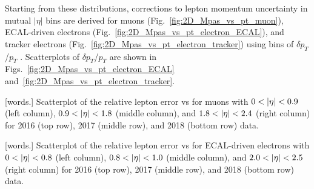 Starting from these distributions, corrections to lepton momentum uncertainty in mutual $|\eta|$ bins are derived for muons (Fig.~\ref{fig:2D_Mpas_vs_pt_muon}), ECAL-driven electrons (Fig.~\ref{fig:2D_Mpas_vs_pt_electron_ECAL}), and tracker electrons (Fig.~\ref{fig:2D_Mpas_vs_pt_electron_tracker}) using bins of $\delta p_{T}$/$p_{T}$ \vs \abseta.
Scatterplots of $\delta p_{T}$/$p_{T}$ \vs \PT are shown in Figs.~\ref{fig:2D_Mpas_vs_pt_electron_ECAL} and~\ref{fig:2D_Mpas_vs_pt_electron_tracker}.
\begin{multiFigure}
    \centering


        [words.]
        {Scatterplot of the relative lepton \PT error vs \PT for muons with $0 < \lvert \eta \rvert < 0.9$ (left column), $0.9 < \lvert \eta \rvert < 1.8$ (middle column), and $1.8 < \lvert \eta \rvert < 2.4$ (right column) for 2016 (top row), 2017 (middle row), and 2018 (bottom row) data.}
    \label{fig:2D_Mpas_vs_pt_muon}
\end{multiFigure}
\begin{multiFigure}
    \centering


        [words.]
        {Scatterplot of the relative lepton \PT error vs \PT for ECAL-driven electrons with $0 < \lvert \eta \rvert < 0.8$ (left column), $0.8 < \lvert \eta \rvert < 1.0$ (middle column), and $2.0 < \lvert \eta \rvert < 2.5$ (right column) for 2016 (top row), 2017 (middle row), and 2018 (bottom row) data.}
    \label{fig:2D_Mpas_vs_pt_electron_ECAL}
\end{multiFigure}
